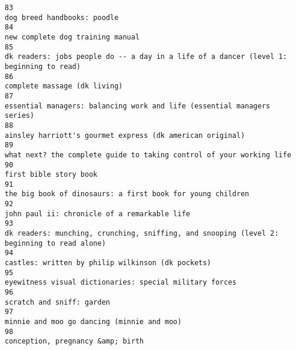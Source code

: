 \documentclass[
]{report}
\begin{document}
\begin{verbatim}
83                                                                                                                                            dog breed handbooks: poodle
84                                                                                                                                       new complete dog training manual
85                                                                                 dk readers: jobs people do -- a day in a life of a dancer (level 1: beginning to read)
86                                                                                                                                           complete massage (dk living)
87                                                                                                essential managers: balancing work and life (essential managers series)
88                                                                                                              ainsley harriott's gourmet express (dk american original)
89                                                                                                   what next? the complete guide to taking control of your working life
90                                                                                                                                                 first bible story book
91                                                                                                             the big book of dinosaurs: a first book for young children
92                                                                                                                           john paul ii: chronicle of a remarkable life
93                                                                             dk readers: munching, crunching, sniffing, and snooping (level 2: beginning to read alone)
94                                                                                                                      castles: written by philip wilkinson (dk pockets)
95                                                                                                                eyewitness visual dictionaries: special military forces
96                                                                                                                                              scratch and sniff: garden
97                                                                                                                             minnie and moo go dancing (minnie and moo)
98                                                                                                                                      conception, pregnancy &amp; birth

\end{verbatim}
\end{document}
